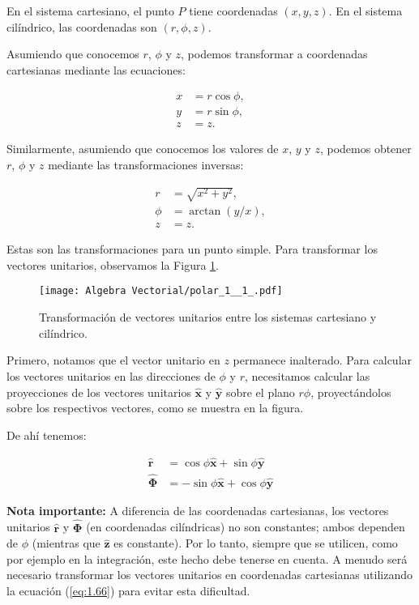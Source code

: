 \documentclass{book}
\begin{document}
En el sistema cartesiano, el punto $P$ tiene coordenadas $(x, y, z)$. En el sistema cilíndrico, las coordenadas son $(r, \phi, z)$.

Asumiendo que conocemos $r$, $\phi$ y $z$, podemos transformar a coordenadas cartesianas mediante las ecuaciones:

\begin{align*}
x &= r \cos \phi, \\
y &= r \sin \phi, \\
z &= z.
\end{align*}

Similarmente, asumiendo que conocemos los valores de $x$, $y$ y $z$, podemos obtener $r$, $\phi$ y $z$ mediante las transformaciones inversas:

\begin{align*}
r &= \sqrt{x^2 + y^2}, \\
\phi &= \arctan(y/x), \\
z &= z.
\end{align*}

Estas son las transformaciones para un punto simple. Para transformar los vectores unitarios, observamos la Figura \ref{fig:transformacion_vectores_unitarios}. 

\begin{figure}[H]
  \centering
  \texttt{[image: Algebra Vectorial/polar\_1\_\_1\_.pdf]}
  \caption{Transformación de vectores unitarios entre los sistemas cartesiano y cilíndrico.}
  \label{fig:transformacion_vectores_unitarios}
\end{figure}

Primero, notamos que el vector unitario en $z$ permanece inalterado. Para calcular los vectores unitarios en las direcciones de $\phi$ y $r$, necesitamos calcular las proyecciones de los vectores unitarios $\mathbf{\hat{x}}$ y $\mathbf{\hat{y}}$ sobre el plano $r\phi$, proyectándolos sobre los respectivos vectores, como se muestra en la figura.

De ahí tenemos:

\begin{align}
\mathbf{\hat{r}} &= \cos \phi \mathbf{\hat{x}} + \sin \phi \mathbf{\hat{y}} \label{eq:1.65}\\
\mathbf{\hat{\Phi}} &= -\sin \phi \mathbf{\hat{x}} + \cos \phi \mathbf{\hat{y}} \label{eq:1.66}
\end{align}

\textbf{Nota importante:} A diferencia de las coordenadas cartesianas, los vectores unitarios $\mathbf{\hat{r}}$ y $\mathbf{\hat{\Phi}}$ (en coordenadas cilíndricas) no son constantes; ambos dependen de $\phi$ (mientras que $\mathbf{\hat{z}}$ es constante). Por lo tanto, siempre que se utilicen, como por ejemplo en la integración, este hecho debe tenerse en cuenta. A menudo será necesario transformar los vectores unitarios en coordenadas cartesianas utilizando la ecuación (\ref{eq:1.66}) para evitar esta dificultad.
\end{document}
